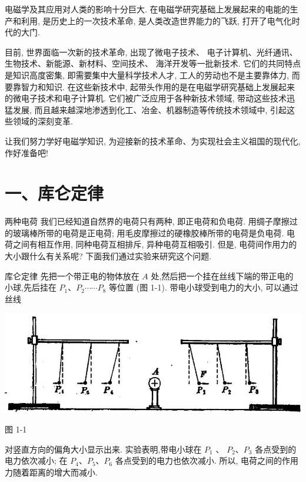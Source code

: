 \documentclass[10pt]{article}
\begin{document}
电磁学及其应用对人类的影响十分巨大. 在电磁学研究基础上发展起来的电能的生产和利用, 是历史上的一次技术革命, 是人类改造世界能力的飞跃, 打开了电气化时代的大门.

目前, 世界面临一次新的技术革命, 出现了微电子技术、 电子计算机、光纤通讯、生物技术、新能源、新材料、空间技术、 海洋开发等一批新技术. 它们的共同特点是知识高度密集, 即需要集中大量科学技术人才, 工人的劳动也不是主要靠体力, 而要靠智力和知识. 在这些新技术中, 起带头作用的是在电磁学研究基础上发展起来的微电子技术和电子计算机. 它们被广泛应用于各种新技术领域, 带动这些技术迅猛发展, 而且越来越深地渗透到化工、冶金、机器制造等传统技术领域中, 引起这些领域的深刻变革.

让我们努力学好电磁学知识, 为迎接新的技术革命、为实现社会主义祖国的现代化, 作好准备吧!

\section*{一、库仑定律}

两种电荷 我们已经知道自然界的电荷只有两种, 即正电荷和负电荷. 用绸子摩擦过的玻璃棒所带的电荷是正电荷; 用毛皮摩擦过的硬橡胶棒所带的电荷是负电荷. 电荷之间有相互作用, 同种电荷互相排斥, 异种电荷互相吸引. 但是, 电荷间作用力的大小跟什么有关系呢? 下面我们通过实验来研究这个问题.

库仑定律 先把一个带正电的物体放在 \(A\) 处,然后把一个挂在丝线下端的带正电的小球,先后挂在 \({P}_{1}\text{、}{P}_{2}\cdots \cdots {P}_{8}\) 等位置 (图 1-1). 带电小球受到电力的大小, 可以通过丝线

\begin{center}
\includegraphics[max width=1.0\textwidth]{images/01913056-1f15-74d8-9184-9aab52c9d66b_14_359528.jpg}
\end{center}

图 1-1

对竖直方向的偏角大小显示出来. 实验表明,带电小球在 \({P}_{1}\) 、 \({P}_{2}\text{、}{P}_{3}\) 各点受到的电力依次减小; 在 \({P}_{4}\text{、}{P}_{5}\text{、}{P}_{6}\) 各点受到的电力也依次减小. 所以, 电荷之间的作用力随着距离的增大而减小.
\end{document}
